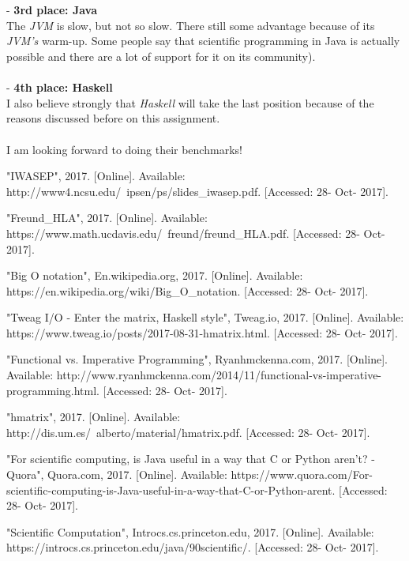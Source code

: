 \documentclass[conference]{IEEEtran}
\begin{document}
\\\\
- \textbf{3rd place: Java}\\
The \textit{JVM} is slow, but not so slow. There still some advantage because of its \textit{JVM's} warm-up. Some people say that scientific programming in Java is actually possible and there are a lot of support for it on its community).
\\\\
- \textbf{4th place: Haskell}\\
I also believe strongly that \textit{Haskell} will take the last position because of the reasons discussed before on this assignment.
\\\\
I am looking forward to doing their benchmarks!

\begin{thebibliography}{00}
 "IWASEP", 2017. [Online]. Available: http://www4.ncsu.edu/~ipsen/ps/slides\_iwasep.pdf. [Accessed: 28- Oct- 2017].

 "Freund\_HLA", 2017. [Online]. Available: https://www.math.ucdavis.edu/~freund/freund\_HLA.pdf. [Accessed: 28- Oct- 2017].

 "Big O notation", En.wikipedia.org, 2017. [Online]. Available: https://en.wikipedia.org/wiki/Big\_O\_notation. [Accessed: 28- Oct- 2017].

 "Tweag I/O - Enter the matrix, Haskell style", Tweag.io, 2017. [Online]. Available: https://www.tweag.io/posts/2017-08-31-hmatrix.html. [Accessed: 28- Oct- 2017].

 "Functional vs. Imperative Programming", Ryanhmckenna.com, 2017. [Online]. Available: http://www.ryanhmckenna.com/2014/11/functional-vs-imperative-programming.html. [Accessed: 28- Oct- 2017].

 "hmatrix", 2017. [Online]. Available: http://dis.um.es/~alberto/material/hmatrix.pdf. [Accessed: 28- Oct- 2017].

 "For scientific computing, is Java useful in a way that C or Python aren't? - Quora", Quora.com, 2017. [Online]. Available: https://www.quora.com/For-scientific-computing-is-Java-useful-in-a-way-that-C-or-Python-arent. [Accessed: 28- Oct- 2017].

 "Scientific Computation", Introcs.cs.princeton.edu, 2017. [Online]. Available: https://introcs.cs.princeton.edu/java/90scientific/. [Accessed: 28- Oct- 2017].


\end{thebibliography}
\end{document}
